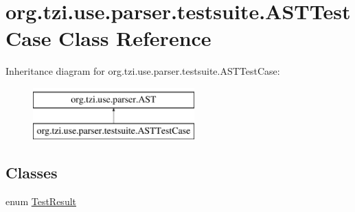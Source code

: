 \hypertarget{classorg_1_1tzi_1_1use_1_1parser_1_1testsuite_1_1_a_s_t_test_case}{\section{org.\-tzi.\-use.\-parser.\-testsuite.\-A\-S\-T\-Test\-Case Class Reference}
\label{classorg_1_1tzi_1_1use_1_1parser_1_1testsuite_1_1_a_s_t_test_case}
}
Inheritance diagram for org.\-tzi.\-use.\-parser.\-testsuite.\-A\-S\-T\-Test\-Case\-:\begin{figure}[H]
\begin{center}
\leavevmode
\includegraphics[height=2.000000cm]{classorg_1_1tzi_1_1use_1_1parser_1_1testsuite_1_1_a_s_t_test_case}
\end{center}
\end{figure}
\subsection*{Classes}
\begin{DoxyCompactItemize}
\item 
enum \hyperlink{enumorg_1_1tzi_1_1use_1_1parser_1_1testsuite_1_1_a_s_t_test_case_1_1_test_result}{Test\-Result}
\end{DoxyCompactItemize}
